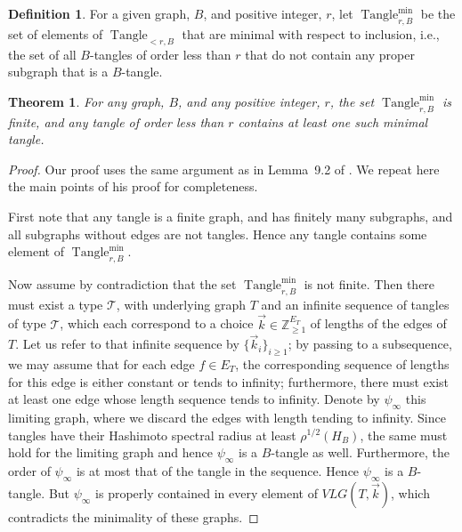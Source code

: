 \documentclass{memo-l}
\theoremstyle{plain}
\theoremstyle{definition}
\newtheorem{definition}[theorem]{Definition}
\numberwithin{section}{chapter}
\numberwithin{equation}{chapter}
\newcommand{\HasTanglemin}{\Tangle_{r,B}^{\min}}
\DeclareMathOperator{\Tangle}{Tangle}
\theoremstyle{plain}
\newtheorem{thm}[theorem]{Theorem}
\theoremstyle{definition}
\newcommand\ZZ{\mathbb{Z}}
\newcommand\cT{\mathcal{T}}
\begin{document}
\begin{definition} For a given graph, $B$, and positive integer, $r$,
let 
$\HasTanglemin$ be the set of elements of $\Tangle_{<r,B}$ that
are minimal with respect to inclusion, i.e., the set of all $B$-tangles
of order less than $r$ that do not contain any proper subgraph that is
a $B$-tangle.
\end{definition}

\begin{thm}\label{thm:tangles_finite}
For any graph, $B$, and any positive integer, $r$,
the set \( \HasTanglemin \) is
finite, and any tangle of order less than $r$ contains at least one
such minimal tangle.  \end{thm} 
\begin{proof} 
Our proof uses the same argument as in
Lemma~9.2 of \cite{friedman_alon}.
We repeat here the main points of his proof for completeness. 

First note that any tangle is a finite graph, and has finitely many
subgraphs, and all subgraphs without edges are not tangles.
Hence any tangle contains some element of 
$\HasTanglemin$.

Now assume by
contradiction that the set 
$\HasTanglemin$ is not finite. Then there must exist a type \(
\cT \), with underlying graph \( T \) and an infinite sequence of tangles
of type \( \cT \), which each correspond to a choice \( \vec k \in
\ZZ_{\geq 1}^{E_T} \) of lengths of the edges of \( T \). Let us refer to
that infinite sequence by \( \{ \vec k_i \}_{i \geq 1} \); 
by passing to a subsequence, we may assume that 
for each edge \( f \in E_T \), the
corresponding sequence of lengths for this edge is either constant or tends
to infinity; furthermore, there must exist at least one edge whose length
sequence tends to infinity. Denote by \( \psi_\infty \) this limiting
graph, where we discard the edges with length tending to infinity. Since
tangles have their Hashimoto spectral radius at least 
$\rho^{1/2}(H_B)$, the
same must hold for the limiting graph and hence \( \psi_\infty \) is a
$B$-tangle as well. Furthermore, the order of \( \psi_\infty \) is at most that
of the tangle in the sequence. Hence $\psi_\infty$ is a $B$-tangle.
But $\psi_\infty$ is properly
contained in every
element of $VLG(T,\vec k)$, which contradicts the minimality of these
graphs.
\end{proof}
\end{document}
